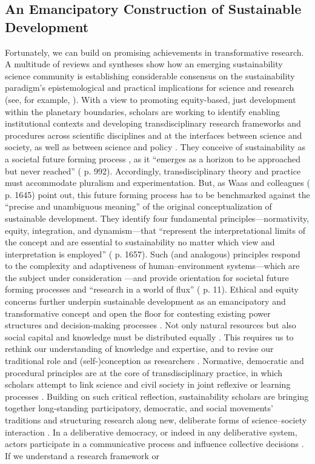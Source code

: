 \documentclass[10pt,a4paper]{article}
\begin{document}
\begin{multicols}{2}
\subsection{An Emancipatory Construction of Sustainable Development}
\noindent Fortunately, we can build on promising achievements in transformative research. A multitude of reviews and syntheses show how an emerging sustainability science community is establishing considerable consensus on the sustainability paradigm's epistemological and practical implications for science and research (see, for example, \citep{r08, r16, r18, r22, r27, r29, r35}). With a view to promoting equity-based, just development within the planetary boundaries, scholars are working to identify enabling institutional contexts and developing transdisciplinary research frameworks and procedures across scientific disciplines and at the interfaces between science and society, as well as between science and policy \citep{r32, r36, r37, r38, r39, r40}. They conceive of sustainability as a societal future forming process \citep{r05}, as it ``emerges as a horizon to be approached but never reached'' (\citep{r42} p. 992). Accordingly, transdisciplinary theory and practice must accommodate pluralism and experimentation. But, as Waas and colleagues (\citep{r04} p. 1645) point out, this future forming process has to be benchmarked against the ``precise and unambiguous meaning'' of the original conceptualization of sustainable development. They identify four fundamental principles---normativity, equity, integration, and dynamism---that ``represent the interpretational limits of the concept and are essential to sustainability no matter which view and interpretation is employed'' (\citep{r04} p. 1657). Such (and analogous) principles respond to the complexity and adaptiveness of human–environment systems---which are the subject under consideration \citep{r33, r43}---and provide orientation for societal future forming processes and ``research in a world of flux'' (\citep{r05} p. 11). Ethical and equity concerns further underpin sustainable development as an emancipatory and transformative concept and open the floor for contesting existing power structures and decision-making processes \citep{r16, r26, r44}. Not only natural resources but also social capital and knowledge must be distributed equally \citep{r23, r45, r46, r47}. This requires us to rethink our understanding of knowledge and expertise, and to revise our traditional role and (self-)conception as researchers \citep{r41, r48, r49}. Normative, democratic and procedural principles are at the core of transdisciplinary practice, in which scholars attempt to link science and civil society in joint reflexive or learning processes \citep{r17, r18, r26, r38, r40}. Building on such critical reflection, sustainability scholars are bringing together long-standing participatory, democratic, and social movements' traditions and structuring research along new, deliberate forms of science–society interaction \citep{r51, r52, r53, r54}. In a deliberative democracy, or indeed in any deliberative system, actors participate in a communicative process and influence collective decisions \citep{r25, r55}. If we understand a research framework or 
\end{multicols}
\end{document}
